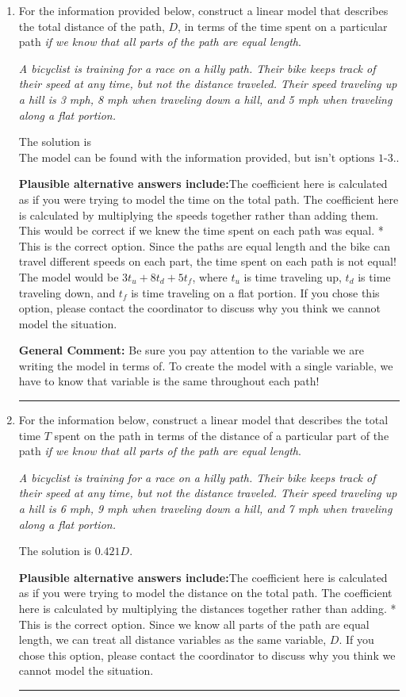 \documentclass{extbook}[14pt]
\newcommand{\litem}[1]{\item #1

\rule{\textwidth}{0.4pt}}
\begin{document}
\begin{enumerate}\litem{
For the information provided below, construct a linear model that describes the total distance of the path, $D$, in terms of the time spent on a particular path \textit{if we know that all parts of the path are equal length}.

\begin{center}
    \textit{ A bicyclist is training for a race on a hilly path. Their bike keeps track of their speed at any time, but not the distance traveled. Their speed traveling up a hill is 3 mph, 8 mph when traveling down a hill, and 5 mph when traveling along a flat portion. }
\end{center}
The solution is \( \text{The model can be found with the information provided, but isn't options 1-3.} \).\begin{enumerate}[label=\Alph*.]
\textbf{Plausible alternative answers include:}The coefficient here is calculated as if you were trying to model the time on the total path.
The coefficient here is calculated by multiplying the speeds together rather than adding them.
This would be correct if we knew the time spent on each path was equal.
* This is the correct option. Since the paths are equal length and the bike can travel different speeds on each part, the time spent on each path is not equal! The model would be $3t_u + 8t_d +5t_f$, where $t_u$ is time traveling up, $t_d$ is time traveling down, and $t_f$ is time traveling on a flat portion.
If you chose this option, please contact the coordinator to discuss why you think we cannot model the situation.
\end{enumerate}

\textbf{General Comment:} Be sure you pay attention to the variable we are writing the model in terms of. To create the model with a single variable, we have to know that variable is the same throughout each path!
}
\litem{
For the information below, construct a linear model that describes the total time $T$ spent on the path in terms of the distance of a particular part of the path \textit{if we know that all parts of the path are equal length}.

\begin{center}
    \textit{ A bicyclist is training for a race on a hilly path. Their bike keeps track of their speed at any time, but not the distance traveled. Their speed traveling up a hill is 6 mph, 9 mph when traveling down a hill, and 7 mph when traveling along a flat portion. }
\end{center}
The solution is \( 0.421 D \).\begin{enumerate}[label=\Alph*.]
\textbf{Plausible alternative answers include:}The coefficient here is calculated as if you were trying to model the distance on the total path.
The coefficient here is calculated by multiplying the distances together rather than adding.
* This is the correct option.
Since we know all parts of the path are equal length, we can treat all distance variables as the same variable, $D$.
If you chose this option, please contact the coordinator to discuss why you think we cannot model the situation.
\end{enumerate}

}
\end{enumerate}
\end{document}
